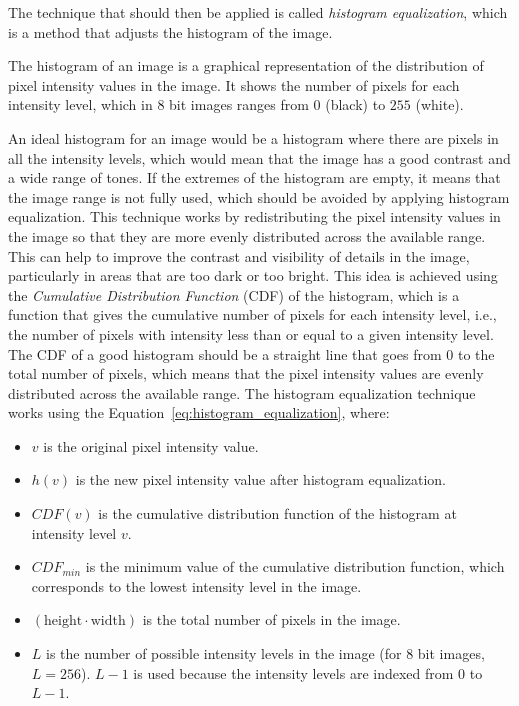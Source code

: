 The technique that should then be applied is called \emph{histogram equalization}, which is a method that adjusts the histogram of the image.
\begin{definicion}[Histogram]
The histogram of an image is a graphical representation of the distribution of pixel intensity values in the image. It shows the number of pixels for each intensity level, which in $8$ bit images ranges from $0$ (black) to $255$ (white).
\end{definicion}

An ideal histogram for an image would be a histogram where there are pixels in all the intensity levels, which would mean that the image has a good contrast and a wide range of tones. If the extremes of the histogram are empty, it means that the image range is not fully used, which should be avoided by applying histogram equalization. This technique works by redistributing the pixel intensity values in the image so that they are more evenly distributed across the available range. This can help to improve the contrast and visibility of details in the image, particularly in areas that are too dark or too bright. This idea is achieved using the \emph{Cumulative Distribution Function} (CDF) of the histogram, which is a function that gives the cumulative number of pixels for each intensity level, i.e., the number of pixels with intensity less than or equal to a given intensity level. The CDF of a good histogram should be a straight line that goes from $0$ to the total number of pixels, which means that the pixel intensity values are evenly distributed across the available range. The histogram equalization technique works using the Equation~\ref{eq:histogram_equalization}, where:
\begin{itemize}
    \item $v$ is the original pixel intensity value.
    \item $h(v)$ is the new pixel intensity value after histogram equalization.
    \item $CDF(v)$ is the cumulative distribution function of the histogram at intensity level $v$.
    \item $CDF_{min}$ is the minimum value of the cumulative distribution function, which corresponds to the lowest intensity level in the image.
    \item $(\text{height}\cdot \text{width})$ is the total number of pixels in the image.
    \item $L$ is the number of possible intensity levels in the image (for $8$ bit images, $L=256$). $L-1$ is used because the intensity levels are indexed from $0$ to $L-1$.
\end{itemize}
